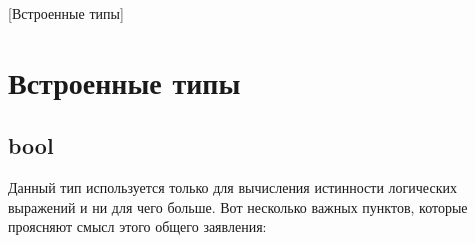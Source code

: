 [Встроенные типы]


\section{Встроенные типы}


\subsection{bool}

Данный тип используется только для вычисления истинности логических выражений и ни для чего больше.
Вот несколько важных пунктов, которые проясняют смысл этого общего заявления:
